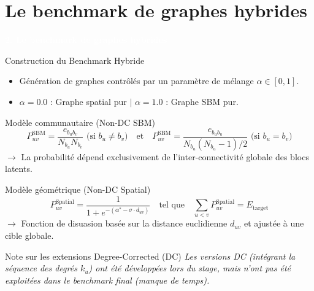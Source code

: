 \documentclass[10pt]{beamer}
\begin{document}
\section{Le benchmark de graphes hybrides}
{
\begin{frame}[plain] %
    \centering
    \vfill
    \Huge \bfseries \textcolor{white}{2. Le benchmark de graphes hybrides}
    \vfill
\end{frame}
}

\begin{frame}{Construction du Benchmark Hybride}
    \begin{itemize}
        \item Génération de graphes contrôlés par un paramètre de mélange $\alpha \in [0, 1]$.
        \item $\alpha = 0.0$ : Graphe spatial pur $|$ $\alpha = 1.0$ : Graphe SBM pur.
    \end{itemize}
 
    \begin{block}{Modèle communautaire (Non-DC SBM)}
        \small
        $$P^{\text{SBM}}_{uv} = \frac{e_{b_u b_v}}{N_{b_u} N_{b_v}} \text{ (si } b_u \neq b_v\text{)} \quad \text{et} \quad P^{\text{SBM}}_{uv} = \frac{e_{b_u b_u}}{N_{b_u}(N_{b_u}-1)/2} \text{ (si } b_u = b_v\text{)}$$
        \footnotesize
        \quad $\rightarrow$ La probabilité dépend exclusivement de l'inter-connectivité globale des blocs latents.
    \end{block}

    \vspace{0.3cm}

    \begin{block}{Modèle géométrique (Non-DC Spatial)}
        \small
        $$P^{\text{Spatial}}_{uv} = \frac{1}{1 + e^{-(\alpha^* - \sigma \cdot d_{uv})}} \quad \text{tel que} \quad \sum_{u < v} P^{\text{Spatial}}_{uv} = E_{\text{target}}$$
        \footnotesize
        \quad $\rightarrow$ Fonction de disuasion basée sur la distance euclidienne $d_{uv}$ et ajustée à une cible globale.
    \end{block}

    \vspace{0.1cm}

    \begin{exampleblock}{\footnotesize Note sur les extensions Degree-Corrected (DC)}
        \scriptsize
        \textit{Les versions DC (intégrant la séquence des degrés $k_u$) ont été développées lors du stage, mais n'ont pas été exploitées dans le benchmark final (manque de temps).}
    \end{exampleblock}
    
\end{frame}
\end{document}
